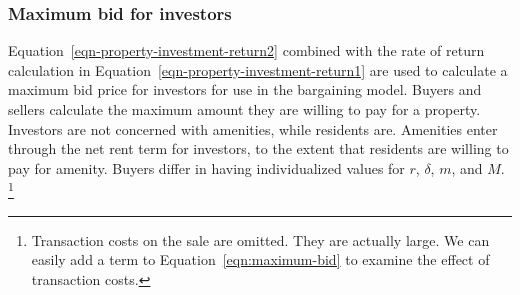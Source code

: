 \subsubsection{Maximum bid for investors}
Equation~\ref{eqn-property-investment-return2} combined with the rate of return calculation in Equation~\ref{eqn-property-investment-return1} are used to calculate a maximum bid price for investors for use in the bargaining model.
% 
Buyers and sellers calculate the maximum amount they are willing to pay for a property.  Investors are not concerned with amenities, while residents are. %
Amenities enter through the net rent term for investors, to the extent that residents are willing to pay for amenity. Buyers differ in having individualized values for $r$, $\delta$, $m$, and $M$.%
\footnote{Transaction costs on the sale are omitted. They are actually large. We can easily add a term to  Equation~\ref{eqn:maximum-bid} to examine the effect of transaction costs.} %

